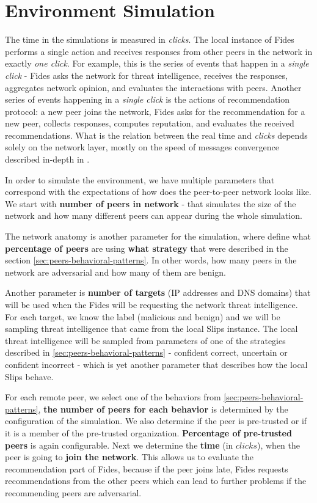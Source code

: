 \section{Environment Simulation}
\label{sec:environment-simulation}
The time in the simulations is measured in \textit{clicks}. 
The local instance of Fides performs a single action and receives responses from other peers in the network in exactly \textit{one click}. 
For example, this is the series of events that happen in a \textit{single click} - Fides asks the network for threat intelligence, receives the responses, aggregates network opinion, and evaluates the interactions with peers.
Another series of events happening in a \textit{single click} is the actions of  recommendation protocol: a new peer joins the network, Fides asks for the recommendation for  a new peer, collects responses, computes reputation, and evaluates the received recommendations.
What is the relation between the real time and \textit{clicks} depends solely on the network layer, mostly on the speed of messages convergence described in-depth in \cite{nl}.

In order to simulate the environment, we have multiple parameters that correspond with the expectations of how does the peer-to-peer network looks like.
We start with \textbf{number of peers in network} - that simulates the size of the network and how many different peers can appear during the whole simulation.

The network anatomy is another parameter for the simulation, where define what \textbf{percentage of peers} are using \textbf{what strategy} that were described in the section \ref{sec:peers-behavioral-patterns}. 
In other words, how many peers in the network are adversarial and how many of them are benign.

Another parameter is \textbf{number of targets} (IP addresses and DNS domains) that will be used when the Fides will be requesting the network threat intelligence.
For each target, we know the label (malicious and benign) and we will be sampling threat intelligence that came from the local Slips instance. 
The local threat intelligence will be sampled from parameters of one of the strategies described in \ref{sec:peers-behavioral-patterns} - confident correct, uncertain or confident incorrect - which is yet another parameter that describes how the local Slips behave.

For each remote peer, we select one of the behaviors from \ref{sec:peers-behavioral-patterns}, \textbf{the number of peers for each behavior} is determined by the configuration of the simulation.
We also determine if the peer is pre-trusted or if it is a member of the pre-trusted organization. \textbf{Percentage of pre-trusted peers} is again configurable.
Next we determine the \textbf{time} (in $clicks$), when the peer is going to \textbf{join the network}. This allows us to evaluate the recommendation part of Fides, because if the peer joins late, Fides requests recommendations from the other peers which can lead to further problems if the recommending peers are adversarial.

